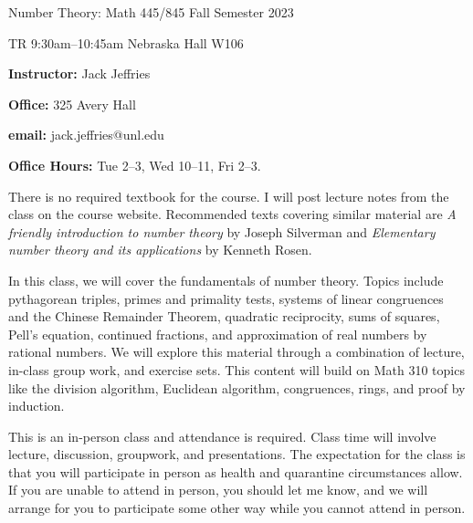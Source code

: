 \documentclass{amsart}
\begin{document}
 








\centerline{\bigbf Number Theory: Math 445/845 Fall Semester 2023}
\centerline{\bigbf TR 9:30am–10:45am Nebraska Hall W106}


\bigskip


\begin{multicols}{2}
\noindent
{\bf Instructor:}  Jack Jeffries

\noindent
{\bf Office:} 325 Avery Hall

\noindent
{\bf email:} jack.jeffries@unl.edu

\noindent
{\bf Office Hours:} Tue 2--3, Wed 10--11, Fri 2--3.
\end{multicols}




There is no required textbook for the course. I will post lecture notes from the class on the course website. Recommended texts covering similar material are
\emph{A friendly introduction to number theory} by Joseph Silverman and
\emph{Elementary number theory and its applications} by Kenneth Rosen.


\medskip


In this class, we will cover the fundamentals of number theory. Topics include pythagorean triples, primes and primality tests, systems of linear congruences and the Chinese Remainder Theorem, quadratic reciprocity, sums of squares, Pell's equation, continued fractions, and approximation of real numbers by rational numbers. We will explore this material through a combination of lecture, in-class group work, and exercise sets. This content will build on Math 310 topics like the division algorithm, Euclidean algorithm, congruences, rings, and proof by induction.


\smallskip

This is an in-person class and attendance is required. Class time will involve lecture, discussion, groupwork, and presentations. The expectation for the class is that you will participate in person as health and quarantine circumstances allow. If you are unable to attend in person, you should let me know, and we will arrange for you to participate some other way while you cannot attend in person.
\end{document}
